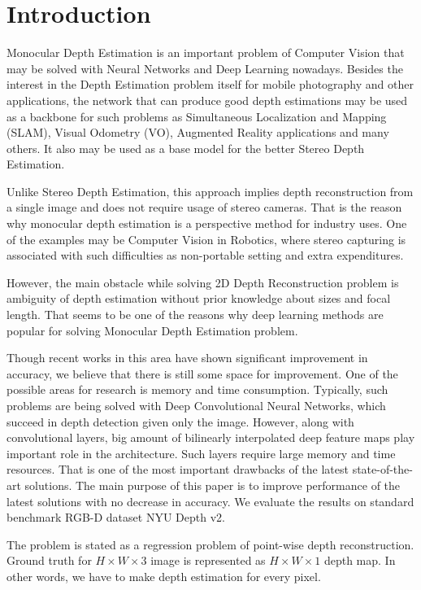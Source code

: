 \documentclass[10pt,twocolumn,letterpaper]{article}
\begin{document}
\section{Introduction}

Monocular Depth Estimation is an important problem of Computer Vision that may be solved with Neural Networks and Deep Learning nowadays. Besides the interest in the Depth Estimation problem itself for mobile photography and other applications, the network that can produce good depth estimations may be used as a backbone for such problems as Simultaneous Localization and Mapping (SLAM), Visual Odometry (VO), Augmented Reality applications and many others. It also may be used as a base model for the better Stereo Depth Estimation.

Unlike Stereo Depth Estimation, this approach implies depth reconstruction from a single image and does not require usage of stereo cameras. That is the reason why monocular depth estimation is a perspective method for industry uses. One of the examples may be Computer Vision in Robotics, where stereo capturing is associated with such difficulties as non-portable setting and extra expenditures.

However, the main obstacle while solving 2D Depth Reconstruction problem is ambiguity of depth estimation without prior knowledge about sizes and focal length. That seems to be one of the reasons why deep learning methods are popular for solving Monocular Depth Estimation problem.

Though recent works in this area have shown significant improvement in accuracy, we believe that there is still some space for improvement. One of the possible areas for research is memory and time consumption. Typically, such problems are being solved with Deep Convolutional Neural Networks, which succeed in depth detection given only the image. However, along with convolutional layers, big amount of bilinearly interpolated deep feature maps play important role in the architecture. Such layers require large memory and time resources. That is one of the most important drawbacks of the latest state-of-the-art solutions. The main purpose of this paper is to improve performance of the latest solutions with no decrease in accuracy. We evaluate the results on standard benchmark RGB-D dataset NYU Depth v2.

The problem is stated as a regression problem of point-wise depth reconstruction. Ground truth for $H \times W \times 3$ image is represented as $H \times W \times 1$ depth map. In other words, we have to make depth estimation for every pixel.
\end{document}
